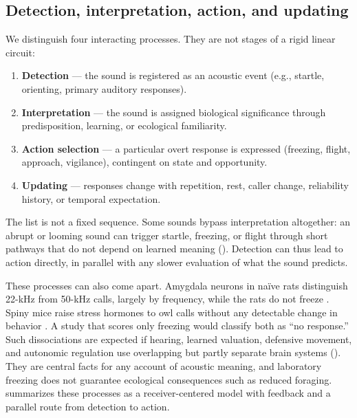 \subsection{Detection, interpretation, action, and updating}
\label{sec:intro-distinctions}

We distinguish four interacting processes. They are not stages of a rigid linear circuit:

\begin{enumerate}[leftmargin=*,itemsep=2pt]
  \item \textbf{Detection} --- the sound is registered as an acoustic event (e.g., startle, orienting, primary auditory responses).
  \item \textbf{Interpretation} --- the sound is assigned biological significance through predisposition, learning, or ecological familiarity.
  \item \textbf{Action selection} --- a particular overt response is expressed (freezing, flight, approach, vigilance), contingent on state and opportunity.
  \item \textbf{Updating} --- responses change with repetition, rest, caller change, reliability history, or temporal expectation.
\end{enumerate}

The list is not a fixed sequence. Some sounds bypass interpretation altogether: an abrupt or looming sound can trigger startle, freezing, or flight through short pathways that do not depend on learned meaning (). Detection can thus lead to action directly, in parallel with any slower evaluation of what the sound predicts.

These processes can also come apart. Amygdala neurons in naïve rats distinguish 22-kHz from 50-kHz calls, largely by frequency, while the rats do not freeze \citep{ParsanaEtAl2012a}. Spiny mice raise stress hormones to owl calls without any detectable change in behavior \citep{EilamEtAl1999}. A study that scores only freezing would classify both as ``no response.'' Such dissociations are expected if hearing, learned valuation, defensive movement, and autonomic regulation use overlapping but partly separate brain systems (). They are central facts for any account of acoustic meaning, and laboratory freezing does not guarantee ecological consequences such as reduced foraging.  summarizes these processes as a receiver-centered model with feedback and a parallel route from detection to action.

